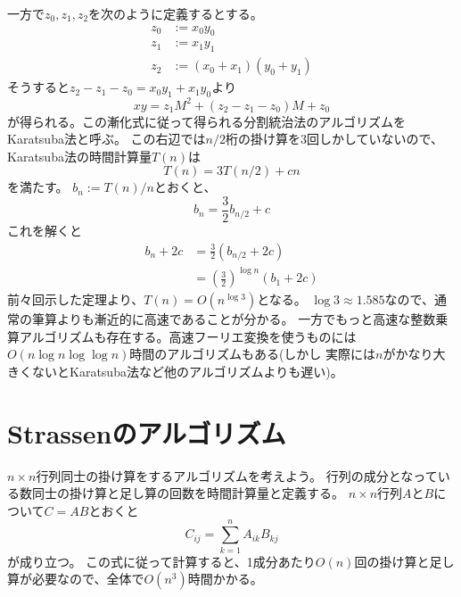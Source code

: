\documentclass[a4paper,twoside,onecolumn,openany,article,10pt]{memoir}
\theoremstyle{definition}
\theoremstyle{remark}
\begin{document}
一方で$z_0, z_1, z_2$を次のように定義するとする。
\begin{align*}
z_0 &:= x_0y_0\\
z_1 &:= x_1y_1\\
z_2 &:= (x_0+x_1)(y_0+y_1)
\end{align*}
そうすると$z_2-z_1-z_0=x_0y_1+x_1y_0$より
\begin{equation*}
xy = z_1 M^2 + (z_2-z_1-z_0) M + z_0
\end{equation*}
が得られる。この漸化式に従って得られる分割統治法のアルゴリズムをKaratsuba法と呼ぶ。
この右辺では$n/2$桁の掛け算を3回しかしていないので、Karatsuba法の時間計算量$T(n)$は
\begin{equation*}
T(n) = 3T(n/2) + cn
\end{equation*}
を満たす。
$b_n:=T(n)/n$とおくと、
\begin{equation*}
b_n = \frac{3}{2} b_{n/2} + c
\end{equation*}
これを解くと
\begin{align*}
b_n + 2c &= \frac{3}{2} \left(b_{n/2} + 2c\right)\\
&= \left(\frac{3}{2}\right)^{\log n} \left(b_{1} + 2c\right)
\end{align*}
\fi
前々回示した定理より、$T(n)=O(n^{\log 3})$となる。
$\log 3 \approx 1.585$なので、通常の筆算よりも漸近的に高速であることが分かる。
一方でもっと高速な整数乗算アルゴリズムも存在する。高速フーリエ変換を使うものには$O(n\log n \log\log n)$時間のアルゴリズムもある(しかし
実際には$n$がかなり大きくないとKaratsuba法など他のアルゴリズムよりも遅い)。


\section{Strassenのアルゴリズム}
$n\times n$行列同士の掛け算をするアルゴリズムを考えよう。
行列の成分となっている数同士の掛け算と足し算の回数を時間計算量と定義する。
$n\times n$行列$A$と$B$について$C=AB$とおくと
\begin{equation*}
C_{ij} = \sum_{k=1}^n A_{ik}B_{kj}
\end{equation*}
が成り立つ。
この式に従って計算すると、1成分あたり$O(n)$回の掛け算と足し算が必要なので、全体で$O(n^3)$時間かかる。
\end{document}
